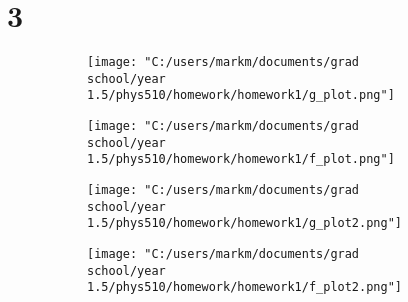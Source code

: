 \documentclass{article}
\begin{document}
\section*{3}
	\begin{figure}[h]
		\begin{subfigure}{0.5\textwidth}
			\centering
			\texttt{[image: "C:/users/markm/documents/grad school/year 1.5/phys510/homework/homework1/g\_plot.png"]}
		\end{subfigure}
		\begin{subfigure}{0.5\textwidth}
			\texttt{[image: "C:/users/markm/documents/grad school/year 1.5/phys510/homework/homework1/f\_plot.png"]}
		\end{subfigure}
	\end{figure}

		\begin{figure}[h]
		\begin{subfigure}{0.5\textwidth}
			\centering
			\texttt{[image: "C:/users/markm/documents/grad school/year 1.5/phys510/homework/homework1/g\_plot2.png"]}
		\end{subfigure}
		\begin{subfigure}{0.5\textwidth}
			\texttt{[image: "C:/users/markm/documents/grad school/year 1.5/phys510/homework/homework1/f\_plot2.png"]}
		\end{subfigure}
	\end{figure}
\end{document}
